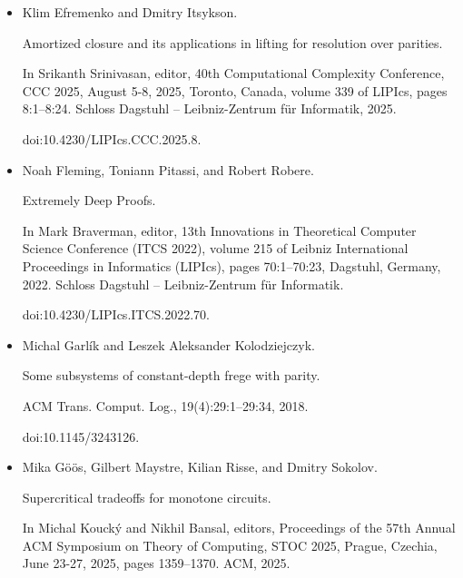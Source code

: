 \begin{itemize}
doi:10.1137/24M1696640.





\item 
[18]

Klim Efremenko and Dmitry Itsykson.


Amortized closure and its applications in lifting for resolution over
parities.


In Srikanth Srinivasan, editor, 40th Computational Complexity
Conference, CCC 2025, August 5-8, 2025, Toronto, Canada, volume 339 of
LIPIcs, pages 8:1–8:24. Schloss Dagstuhl – Leibniz-Zentrum für
Informatik, 2025.


doi:10.4230/LIPIcs.CCC.2025.8.





\item 
[19]

Noah Fleming, Toniann Pitassi, and Robert Robere.


Extremely Deep Proofs.


In Mark Braverman, editor, 13th Innovations in Theoretical
Computer Science Conference (ITCS 2022), volume 215 of Leibniz
International Proceedings in Informatics (LIPIcs), pages 70:1–70:23,
Dagstuhl, Germany, 2022. Schloss Dagstuhl – Leibniz-Zentrum für
Informatik.


doi:10.4230/LIPIcs.ITCS.2022.70.





\item 
[20]

Michal Garlík and Leszek Aleksander Kolodziejczyk.


Some subsystems of constant-depth frege with parity.


ACM Trans. Comput. Log., 19(4):29:1–29:34, 2018.


doi:10.1145/3243126.





\item 
[21]

Mika Göös, Gilbert Maystre, Kilian Risse, and Dmitry Sokolov.


Supercritical tradeoffs for monotone circuits.


In Michal Koucký and Nikhil Bansal, editors, Proceedings
of the 57th Annual ACM Symposium on Theory of Computing, STOC 2025,
Prague, Czechia, June 23-27, 2025, pages 1359–1370. ACM, 2025.



\end{itemize}
